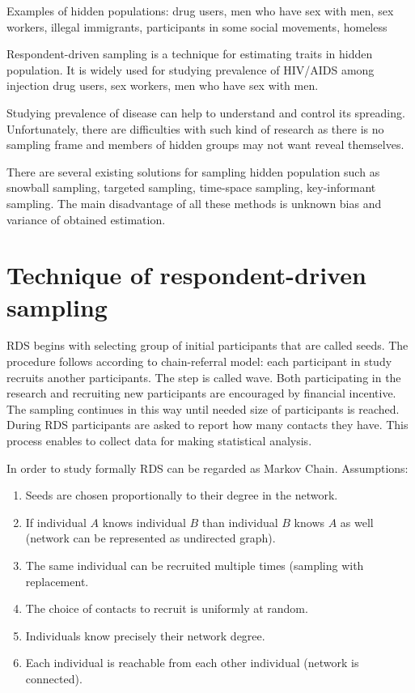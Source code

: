 \documentclass[12pt]{report}
\begin{document}
Examples of hidden populations: drug users, men who have sex with men, sex workers, illegal immigrants, participants in some social movements, homeless \cite{salganik2004sampling}

Respondent-driven sampling is a technique for estimating traits in hidden population. It is widely used for studying prevalence of HIV/AIDS among injection drug users, sex workers, men who have sex with men.  

Studying prevalence of disease can help to understand and control its spreading. Unfortunately, there are difficulties with such kind of research as there is no sampling frame and members of hidden groups may not want reveal themselves. 

There are several existing solutions for sampling hidden population such as snowball sampling, targeted sampling, time-space sampling, key-informant sampling. The main disadvantage of all these methods is unknown bias and variance of obtained estimation.


\section{Technique of respondent-driven sampling}
RDS begins with selecting group of initial participants that are called seeds. The procedure follows according to chain-referral model: each participant in study recruits another participants. The step is called wave. Both participating in the research and recruiting new participants are encouraged by financial incentive. The sampling continues in this way until needed size of participants is reached. During RDS participants are asked to report how many contacts they have.
This process enables to collect data for making statistical analysis.

In order to study formally RDS can be regarded as Markov Chain.
Assumptions:
\begin{enumerate}
  \item Seeds are chosen proportionally to their degree in the network.  
  \item If individual $A$ knows individual $B$ than individual $B$ knows $A$ as well (network can be represented as undirected graph).
  \item The same individual can be recruited multiple times (sampling with replacement.
  \item The choice of contacts to recruit is uniformly at random.
  \item Individuals know precisely their network degree. 
  \item Each individual is reachable from each other individual (network is connected). 
\end{enumerate}
\end{document}
